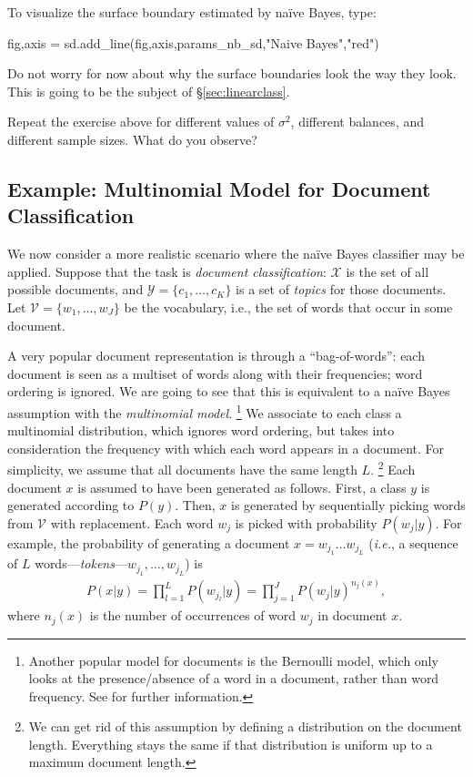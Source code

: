 \begin{exercise}
\begin{enumerate}
To visualize the surface boundary estimated by na\"ive Bayes, type: 
\begin{python}
fig,axis = sd.add_line(fig,axis,params_nb_sd,"Naive Bayes","red")
\end{python}
Do not worry for now about why the surface boundaries look the way they look. This is going to be the subject of \S\ref{sec:linearclass}. 


Repeat the exercise above for different values of $\sigma^2$, different balances, and different sample sizes. What do you observe? 

\end{enumerate}
\end{exercise}


\subsection{Example: Multinomial Model for Document Classification}

We now consider a more realistic scenario where the na\"ive Bayes classifier may be applied. 
Suppose that the task is \emph{document classification}: 
$\mathcal{X}$ is the set of all possible documents, and $\mathcal{Y}=\{c_1,\ldots,c_K\}$ is a set of \emph{topics} for those documents. 
Let $\mathcal{V} = \{w_1,\ldots,w_J\}$ be the vocabulary, i.e., the set of words that occur in some document. 

A very popular document representation is through a ``bag-of-words'': each document is seen as a multiset of words along with 
their frequencies; word ordering is ignored. We are going to see that this is equivalent to a na\"ive Bayes assumption 
with the \emph{multinomial model}.%
\footnote{Another popular model for documents is the Bernoulli model, which only looks at the presence/absence of a word in a 
document, rather than word frequency. See \cite{Manning2008,McCallum1998} for further information.} %
We associate to each class a multinomial distribution, which ignores word ordering, but takes into consideration the 
frequency with which each word appears in a document. For simplicity, we assume that all documents have the same length $L$.%
\footnote{We can get rid of this assumption by defining a distribution on the document length. Everything stays the same 
if that distribution is uniform up to a maximum document length.} %
Each document $x$ is assumed to have been generated as follows. First, a class $y$ is generated according to $P(y)$. Then, 
$x$ is generated by sequentially picking words from $\mathcal{V}$ with replacement. Each word $w_j$ is picked with probability $P(w_j|y)$. 
For example, the probability of generating a document $x = w_{j_1}\ldots w_{j_L}$ (\emph{i.e.}, a sequence of 
$L$ words---\emph{tokens}---$w_{j_1},\ldots,w_{j_L}$) is 
\begin{eqnarray}
P(x|y) = \prod_{l=1}^L P(w_{j_l}|y) = \prod_{j=1}^J P(w_j|y)^{n_j(x)},
\end{eqnarray}
where $n_j(x)$ is the number of occurrences of word $w_j$ in document $x$. 

